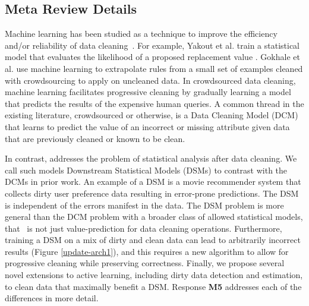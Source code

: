\subsection*{Meta Review Details} 
Machine learning has been studied as a technique to improve the efficiency and/or reliability of data cleaning~\cite{yakout2013don,gokhale2014corleone}.
For example, Yakout et al. train a statistical model that evaluates the likelihood of a proposed replacement value \cite{yakout2013don}.
Gokhale et al. \cite{gokhale2014corleone} use machine learning to extrapolate rules from a small set of examples cleaned with crowdsourcing to apply on uncleaned data.
In crowdsourced data cleaning, machine learning facilitates progressive cleaning by gradually learning a model that predicts the results of the expensive human queries.
A common thread in the existing literature, crowdsourced or otherwise, is a Data Cleaning Model (DCM) that learns to predict the value of an incorrect or missing attribute given data that are previously cleaned or known to be clean.

In contrast, \sys addresses the problem of statistical analysis after data cleaning.
We call such models Downstream Statistical Models (DSMs) to contrast with the DCMs in prior work.
An example of a DSM is a movie recommender system that collects dirty user preference data resulting in error-prone predictions.
The DSM is independent of the errors manifest in the data.
The DSM problem is more general than the DCM problem with a broader class of allowed statistical models, that~ is not just value-prediction for data cleaning operations.
Furthermore, training a DSM on a mix of dirty and clean data can lead to arbitrarily incorrect results (Figure \ref{update-arch1}), and this requires a new algorithm to allow for progressive cleaning while preserving correctness.
Finally, we propose several novel extensions to active learning, including dirty data detection and estimation, to clean data that maximally benefit a DSM.
Response \textbf{M5} addresses each of the differences in more detail.


\vspace{0.5em}

